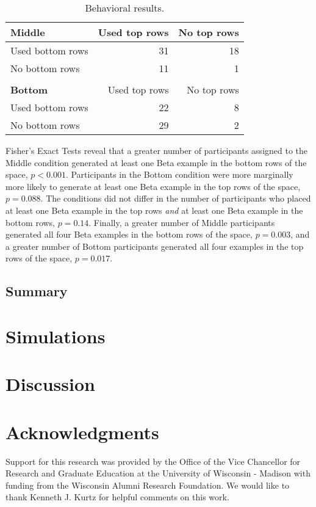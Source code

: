 \documentclass[10pt,letterpaper]{article}
\begin{document}
\begin{table}
\begin{center} 
\caption{Behavioral results.} 
\label{table:subset-table} 
\vskip 0.12in
\begin{tabular}{ l r r}
    \textbf{Middle}         & Used top rows & No top rows \\
    \hline
    Used bottom rows        &  31 & 18  \\
    No bottom rows          &  11 &  1  \\
    \\
    \textbf{Bottom}         & Used top rows & No top rows \\
    \hline
    Used bottom rows        & 22 & 8 \\
    No bottom rows          & 29 & 2 \\
\end{tabular}
\end{center} 
\end{table}


Fisher's Exact Tests reveal that a greater number of participants assigned to the Middle condition generated at least one Beta example in the bottom rows of the space, $p < 0.001$. Participants in the Bottom condition were more marginally more likely to generate at least one Beta example in the top rows of the space, $p = 0.088$. The conditions did not differ in the number of participants who placed at least one Beta example in the top rows \textit{and} at least one Beta example in the bottom rows, $p = 0.14$. Finally, a greater number of Middle participants generated all four Beta examples in the bottom rows of the space, $p = 0.003$, and a greater number of Bottom participants generated all four examples in the top rows of the space, $p = 0.017$. 





\subsection{Summary}


\section{Simulations}
\section{Discussion}
\section{Acknowledgments}
Support for this research was provided by the Office of the Vice Chancellor for Research and Graduate Education at the University of Wisconsin - Madison with funding from the Wisconsin Alumni Research Foundation. We would like to thank Kenneth J. Kurtz for helpful comments on this work.




\setlength{\bibleftmargin}{.025in}
\setlength{\bibindent}{-\bibleftmargin}

\end{document}
